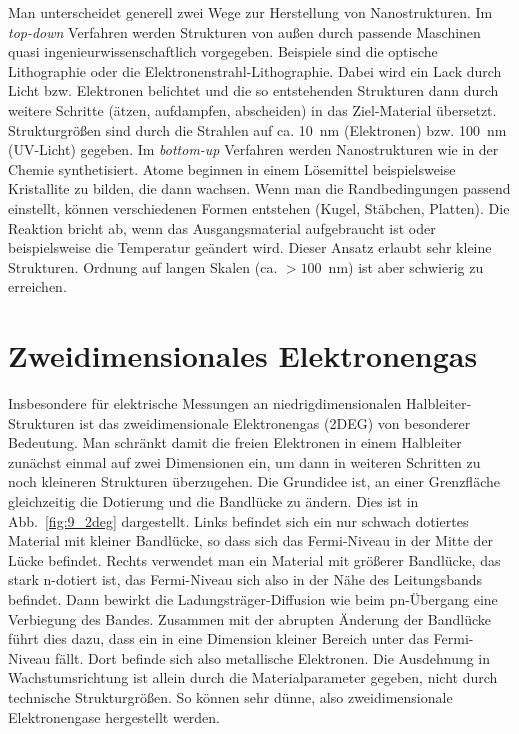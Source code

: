 Man unterscheidet generell zwei Wege zur Herstellung von Nanostrukturen. Im \emph{top-down} Verfahren werden Strukturen von außen durch passende Maschinen quasi ingenieurwissenschaftlich vorgegeben. Beispiele sind die optische Lithographie oder die Elektronenstrahl-Lithographie. Dabei wird ein Lack durch Licht bzw. Elektronen belichtet und die so entstehenden Strukturen  dann durch weitere Schritte (ätzen, aufdampfen, abscheiden) in das Ziel-Material übersetzt. Strukturgrößen sind durch die Strahlen auf ca. 10~nm (Elektronen) bzw. 100~nm (UV-Licht) gegeben. Im \emph{bottom-up} Verfahren werden Nanostrukturen wie in der Chemie synthetisiert. Atome beginnen in einem Lösemittel beispielsweise Kristallite zu bilden, die dann wachsen. Wenn man die Randbedingungen passend einstellt, können verschiedenen Formen entstehen (Kugel, Stäbchen, Platten). Die Reaktion bricht ab, wenn das Ausgangsmaterial aufgebraucht ist oder beispielsweise die Temperatur geändert wird. Dieser Ansatz erlaubt sehr kleine Strukturen. Ordnung auf langen Skalen (ca. $> 100$~nm) ist aber schwierig zu erreichen.


\section*{Zweidimensionales Elektronengas}

Insbesondere für elektrische Messungen an niedrigdimensionalen Halbleiter-Strukturen ist das zweidimensionale Elektronengas (2DEG) von besonderer Bedeutung. Man schränkt damit die freien Elektronen in einem Halbleiter zunächst einmal auf zwei Dimensionen ein, um dann in weiteren Schritten zu noch kleineren Strukturen überzugehen. Die Grundidee ist, an einer Grenzfläche gleichzeitig die Dotierung und die Bandlücke zu ändern. Dies ist in Abb.~\ref{fig:9_2deg} dargestellt. Links befindet sich ein nur schwach dotiertes Material mit kleiner Bandlücke, so dass sich das Fermi-Niveau in der Mitte der Lücke befindet. Rechts verwendet man ein Material mit größerer Bandlücke, das stark n-dotiert ist, das Fermi-Niveau sich also in der Nähe des Leitungsbands befindet. Dann bewirkt die Ladungsträger-Diffusion wie beim pn-Übergang eine Verbiegung des Bandes. Zusammen mit der abrupten Änderung der Bandlücke führt dies dazu, dass ein in eine Dimension kleiner Bereich unter das Fermi-Niveau fällt. Dort befinde sich also metallische Elektronen. Die Ausdehnung in Wachstumsrichtung ist allein durch die Materialparameter gegeben, nicht durch technische Strukturgrößen. So können sehr dünne, also zweidimensionale Elektronengase hergestellt werden.


